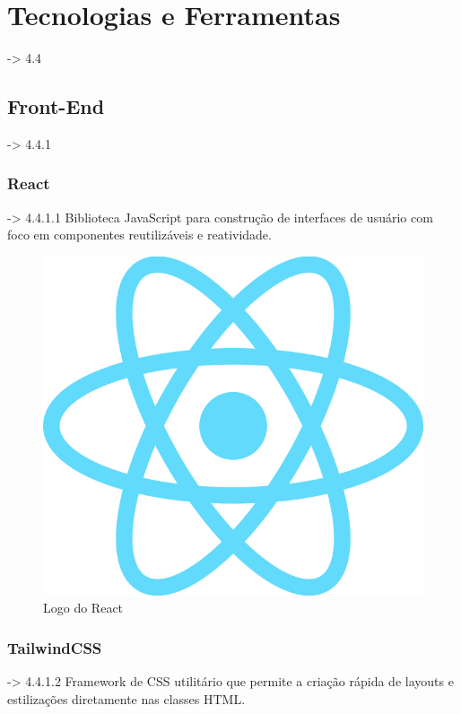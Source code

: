 \section{Tecnologias e Ferramentas} -> 4.4

\subsection{Front-End} -> 4.4.1

\subsubsection{React} -> 4.4.1.1
Biblioteca JavaScript para construção de interfaces de usuário com foco em componentes reutilizáveis e reatividade.

\begin{figure}[htb]
  \centering
  \includegraphics[width=\textwidth]{cap04-desenvolvimento/images/4-4-1-1-react}
  \caption{Logo do React}
  \label{fig:diagrama-implantacao}
\end{figure}

\subsubsection{TailwindCSS} -> 4.4.1.2
Framework de CSS utilitário que permite a criação rápida de layouts e estilizações diretamente nas classes HTML.

